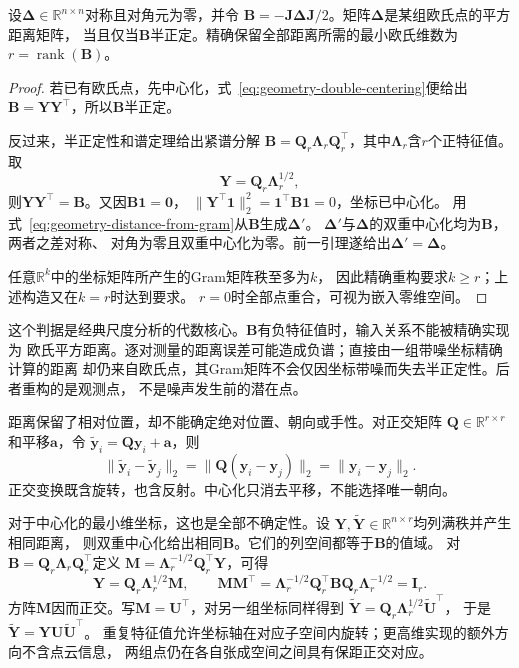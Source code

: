 \begin{theorem}[有限距离的欧氏坐标重构]
\label{thm:geometry-euclidean-distance-embedding}
设$\bm\Delta\in\mathbb R^{n\times n}$对称且对角元为零，并令
$\bm B=-\bm J\bm\Delta\bm J/2$。矩阵$\bm\Delta$是某组欧氏点的平方距离矩阵，
当且仅当$\bm B$半正定。精确保留全部距离所需的最小欧氏维数为
$r=\operatorname{rank}(\bm B)$。
\end{theorem}
\begin{proof}
若已有欧氏点，先中心化，式~\eqref{eq:geometry-double-centering}便给出
$\bm B=\bm Y\bm Y^\top$，所以$\bm B$半正定。

反过来，半正定性和谱定理给出紧谱分解
$\bm B=\bm Q_r\bm\Lambda_r\bm Q_r^\top$，其中$\bm\Lambda_r$含$r$个正特征值。
取
\begin{equation}
  \bm Y=\bm Q_r\bm\Lambda_r^{1/2},
  \label{eq:geometry-classical-scaling-coordinates}
\end{equation}
则$\bm Y\bm Y^\top=\bm B$。又因$\bm B\bm1=\bm0$，
$\lVert\bm Y^\top\bm1\rVert_2^2=\bm1^\top\bm B\bm1=0$，坐标已中心化。
用式~\eqref{eq:geometry-distance-from-gram}从$\bm B$生成$\bm\Delta'$。
$\bm\Delta'$与$\bm\Delta$的双重中心化均为$\bm B$，两者之差对称、
对角为零且双重中心化为零。前一引理遂给出$\bm\Delta'=\bm\Delta$。

任意$\mathbb R^k$中的坐标矩阵所产生的Gram矩阵秩至多为$k$，
因此精确重构要求$k\geq r$；上述构造又在$k=r$时达到要求。
$r=0$时全部点重合，可视为嵌入零维空间。
\end{proof}

这个判据是经典尺度分析的代数核心。$\bm B$有负特征值时，输入关系不能被精确实现为
欧氏平方距离。逐对测量的距离误差可能造成负谱；直接由一组带噪坐标精确计算的距离
却仍来自欧氏点，其Gram矩阵不会仅因坐标带噪而失去半正定性。后者重构的是观测点，
不是噪声发生前的潜在点。

距离保留了相对位置，却不能确定绝对位置、朝向或手性。对正交矩阵
$\bm Q\in\mathbb R^{r\times r}$和平移$\bm a$，令
$\widetilde{\bm y}_i=\bm Q\bm y_i+\bm a$，则
\[
 \lVert\widetilde{\bm y}_i-\widetilde{\bm y}_j\rVert_2
 =\lVert\bm Q(\bm y_i-\bm y_j)\rVert_2
 =\lVert\bm y_i-\bm y_j\rVert_2.
\]
正交变换既含旋转，也含反射。中心化只消去平移，不能选择唯一朝向。

对于中心化的最小维坐标，这也是全部不确定性。设
$\bm Y,\widetilde{\bm Y}\in\mathbb R^{n\times r}$均列满秩并产生相同距离，
则双重中心化给出相同$\bm B$。它们的列空间都等于$\bm B$的值域。
对$\bm B=\bm Q_r\bm\Lambda_r\bm Q_r^\top$定义
$\bm M=\bm\Lambda_r^{-1/2}\bm Q_r^\top\bm Y$，可得
\[
 \bm Y=\bm Q_r\bm\Lambda_r^{1/2}\bm M,\qquad
 \bm M\bm M^\top
 =\bm\Lambda_r^{-1/2}\bm Q_r^\top\bm B\bm Q_r
   \bm\Lambda_r^{-1/2}=\bm I_r.
\]
方阵$\bm M$因而正交。写$\bm M=\bm U^\top$，对另一组坐标同样得到
$\widetilde{\bm Y}=\bm Q_r\bm\Lambda_r^{1/2}\widetilde{\bm U}^\top$，
于是$\widetilde{\bm Y}=\bm Y\bm U\widetilde{\bm U}^\top$。
重复特征值允许坐标轴在对应子空间内旋转；更高维实现的额外方向不含点云信息，
两组点仍在各自张成空间之间具有保距正交对应。

